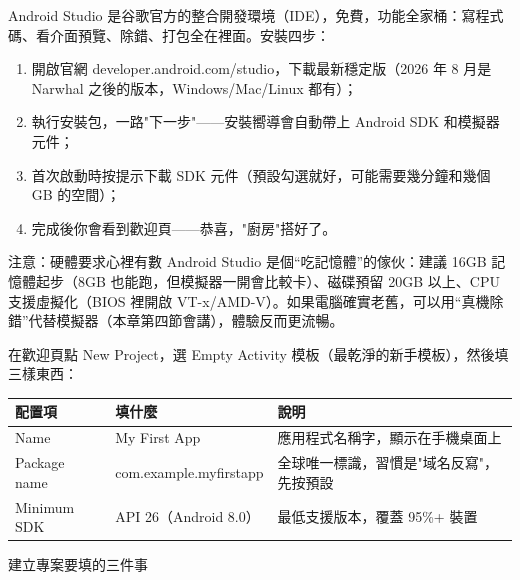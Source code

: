 


Android Studio 是谷歌官方的整合開發環境（IDE），免費，功能全家桶：寫程式碼、看介面預覽、除錯、打包全在裡面。安裝四步：

\begin{enumerate}
  \item 開啟官網 developer.android.com/studio，下載最新穩定版（2026 年 8 月是 Narwhal 之後的版本，Windows/Mac/Linux 都有）；
  \item 執行安裝包，一路"下一步"——安裝嚮導會自動帶上 Android SDK 和模擬器元件；
  \item 首次啟動時按提示下載 SDK 元件（預設勾選就好，可能需要幾分鐘和幾個 GB 的空間）；
  \item 完成後你會看到歡迎頁——恭喜，"廚房"搭好了。
\end{enumerate}

\begin{tcbwarn}{注意：硬體要求心裡有數}
Android Studio 是個“吃記憶體”的傢伙：建議 16GB 記憶體起步（8GB 也能跑，但模擬器一開會比較卡）、磁碟預留 20GB 以上、CPU 支援虛擬化（BIOS 裡開啟 VT-x/AMD-V）。如果電腦確實老舊，可以用“真機除錯”代替模擬器（本章第四節會講），體驗反而更流暢。

\end{tcbwarn}


在歡迎頁點 New Project，選 Empty Activity 模板（最乾淨的新手模板），然後填三樣東西：

\begin{center}
\begin{tabularx}{\linewidth}{|X|X|X|}
\hline
\textbf{配置項} & \textbf{填什麼} & \textbf{說明} \tabularnewline
\hline
Name & My First App & 應用程式名稱字，顯示在手機桌面上 \tabularnewline
Package name & com.example.myfirstapp & 全球唯一標識，習慣是"域名反寫"，先按預設 \tabularnewline
Minimum SDK & API 26（Android 8.0） & 最低支援版本，覆蓋 95\%+ 裝置 \tabularnewline
\hline
\end{tabularx}
\end{center}

\begin{center}\small\color{gray}建立專案要填的三件事\end{center}

